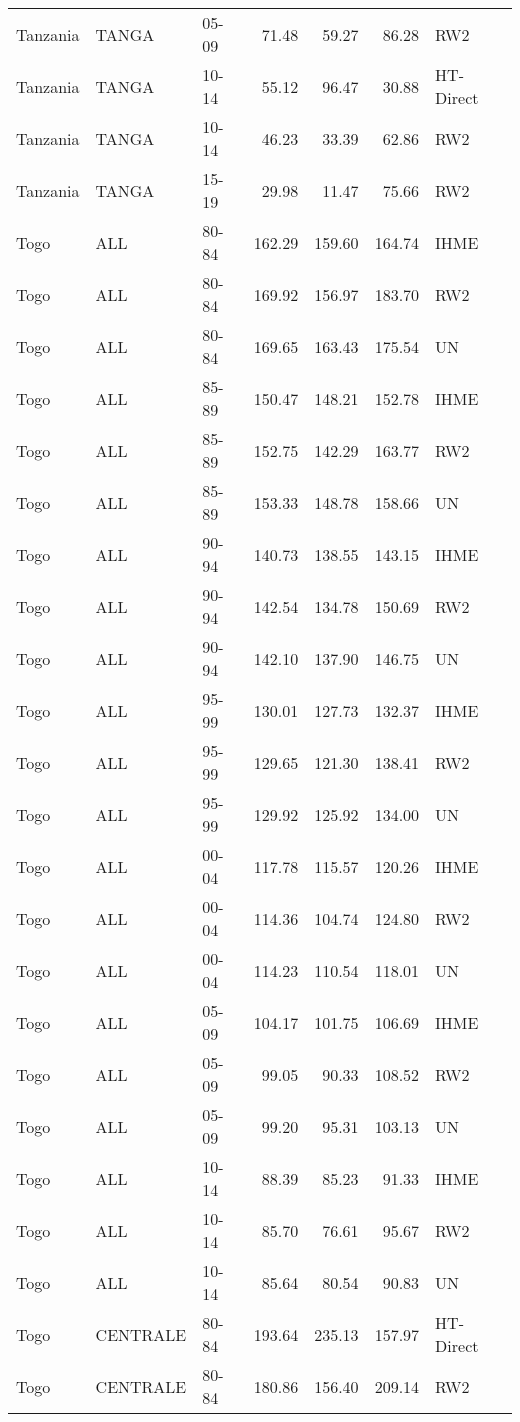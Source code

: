 \begin{longtable}{lllrrrl}
  Tanzania & TANGA & 05-09 & 71.48 & 59.27 & 86.28 & RW2 \\ 
  Tanzania & TANGA & 10-14 & 55.12 & 96.47 & 30.88 & HT-Direct \\ 
  Tanzania & TANGA & 10-14 & 46.23 & 33.39 & 62.86 & RW2 \\ 
  Tanzania & TANGA & 15-19 & 29.98 & 11.47 & 75.66 & RW2 \\ 
  Togo & ALL & 80-84 & 162.29 & 159.60 & 164.74 & IHME \\ 
  Togo & ALL & 80-84 & 169.92 & 156.97 & 183.70 & RW2 \\ 
  Togo & ALL & 80-84 & 169.65 & 163.43 & 175.54 & UN \\ 
  Togo & ALL & 85-89 & 150.47 & 148.21 & 152.78 & IHME \\ 
  Togo & ALL & 85-89 & 152.75 & 142.29 & 163.77 & RW2 \\ 
  Togo & ALL & 85-89 & 153.33 & 148.78 & 158.66 & UN \\ 
  Togo & ALL & 90-94 & 140.73 & 138.55 & 143.15 & IHME \\ 
  Togo & ALL & 90-94 & 142.54 & 134.78 & 150.69 & RW2 \\ 
  Togo & ALL & 90-94 & 142.10 & 137.90 & 146.75 & UN \\ 
  Togo & ALL & 95-99 & 130.01 & 127.73 & 132.37 & IHME \\ 
  Togo & ALL & 95-99 & 129.65 & 121.30 & 138.41 & RW2 \\ 
  Togo & ALL & 95-99 & 129.92 & 125.92 & 134.00 & UN \\ 
  Togo & ALL & 00-04 & 117.78 & 115.57 & 120.26 & IHME \\ 
  Togo & ALL & 00-04 & 114.36 & 104.74 & 124.80 & RW2 \\ 
  Togo & ALL & 00-04 & 114.23 & 110.54 & 118.01 & UN \\ 
  Togo & ALL & 05-09 & 104.17 & 101.75 & 106.69 & IHME \\ 
  Togo & ALL & 05-09 & 99.05 & 90.33 & 108.52 & RW2 \\ 
  Togo & ALL & 05-09 & 99.20 & 95.31 & 103.13 & UN \\ 
  Togo & ALL & 10-14 & 88.39 & 85.23 & 91.33 & IHME \\ 
  Togo & ALL & 10-14 & 85.70 & 76.61 & 95.67 & RW2 \\ 
  Togo & ALL & 10-14 & 85.64 & 80.54 & 90.83 & UN \\ 
  Togo & CENTRALE & 80-84 & 193.64 & 235.13 & 157.97 & HT-Direct \\ 
  Togo & CENTRALE & 80-84 & 180.86 & 156.40 & 209.14 & RW2 \\ 

\end{longtable}
